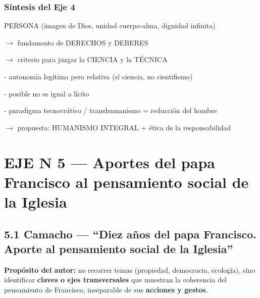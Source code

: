 \documentclass[10pt,a4paper]{article}
\newenvironment{esquema}{\par\medskip\begingroup\small\ttfamily\color{sub}}{\endgroup\medskip}
\begin{document}
\subsubsection{Síntesis del Eje 4}
\begin{esquema}
\noindent\hspace*{0.0em}PERSONA (imagen de Dios, unidad cuerpo-alma, dignidad infinita)\par
\noindent\hspace*{1.7em}$\rightarrow$ fundamento de DERECHOS y DEBERES\par
\noindent\hspace*{1.7em}$\rightarrow$ criterio para juzgar la CIENCIA y la TÉCNICA\par
\noindent\hspace*{4.4em}- autonomía legítima pero relativa (sí ciencia, no cientifismo)\par
\noindent\hspace*{4.4em}- posible no es igual a lícito\par
\noindent\hspace*{4.4em}- paradigma tecnocrático / transhumanismo = reducción del hombre\par
\noindent\hspace*{1.7em}$\rightarrow$ propuesta: HUMANISMO INTEGRAL + ética de la responsabilidad\par
\end{esquema}



\clearpage\section{EJE N\textordmasculine{} 5 --- Aportes del papa Francisco al pensamiento social de la Iglesia}

\subsection{5.1 Camacho --- ``Diez años del papa Francisco. Aporte al pensamiento social de la Iglesia''}

\noindent \textbf{Propósito del autor:} no recorrer temas (propiedad, democracia, ecología), sino identificar \textbf{claves o ejes transversales} que muestran la coherencia del pensamiento de Francisco, inseparable de sus \textbf{acciones y gestos}.\par\smallskip
\end{document}

